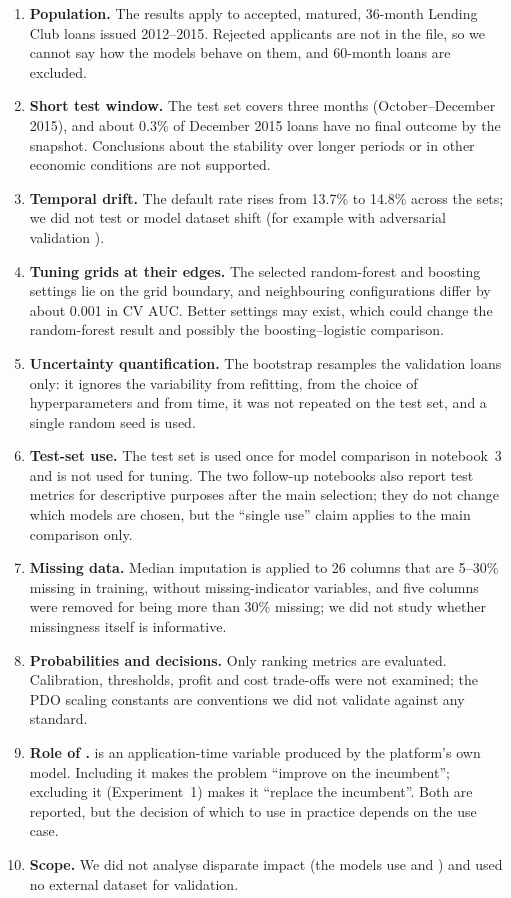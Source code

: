 \begin{enumerate}
    \item \textbf{Population.} The results apply to accepted, matured, 36-month Lending Club loans issued 2012--2015. Rejected applicants are not in the file, so we cannot say how the models behave on them, and 60-month loans are excluded.
    \item \textbf{Short test window.} The test set covers three months (October--December 2015), and about 0.3\% of December 2015 loans have no final outcome by the snapshot. Conclusions about the stability over longer periods or in other economic conditions are not supported.
    \item \textbf{Temporal drift.} The default rate rises from 13.7\% to 14.8\% across the sets; we did not test or model dataset shift (for example with adversarial validation \cite{qian2021}).
    \item \textbf{Tuning grids at their edges.} The selected random-forest and boosting settings lie on the grid boundary, and neighbouring configurations differ by about 0.001 in CV AUC. Better settings may exist, which could change the random-forest result and possibly the boosting--logistic comparison.
    \item \textbf{Uncertainty quantification.} The bootstrap resamples the validation loans only: it ignores the variability from refitting, from the choice of hyperparameters and from time, it was not repeated on the test set, and a single random seed is used.
    \item \textbf{Test-set use.} The test set is used once for model comparison in notebook~3 and is not used for tuning. The two follow-up notebooks also report test metrics for descriptive purposes after the main selection; they do not change which models are chosen, but the ``single use'' claim applies to the main comparison only.
    \item \textbf{Missing data.} Median imputation is applied to 26 columns that are 5--30\% missing in training, without missing-indicator variables, and five  columns were removed for being more than 30\% missing; we did not study whether missingness itself is informative.
    \item \textbf{Probabilities and decisions.} Only ranking metrics are evaluated. Calibration, thresholds, profit and cost trade-offs were not examined; the PDO scaling constants are conventions we did not validate against any standard.
    \item \textbf{Role of .}  is an application-time variable produced by the platform's own model. Including it makes the problem ``improve on the incumbent''; excluding it (Experiment~1) makes it ``replace the incumbent''. Both are reported, but the decision of which to use in practice depends on the use case.
    \item \textbf{Scope.} We did not analyse disparate impact (the models use  and ) and used no external dataset for validation.
\end{enumerate}

